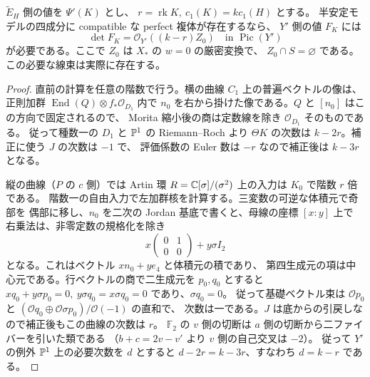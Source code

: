 \begin{proposition}[完全忠実性を仮定しない場合の必要な行列式]\label{vbm:prop:required-line}
$\widetilde E_H$ 側の値を $\Psi'(K)$ とし、
$r=\operatorname{rk}K,\ c_1(K)=k c_1(H)$ とする。
半安定モデルの四成分に compatible な perfect 複体が存在するなら、
$Y'$ 側の値 $F_K$ には
\[
                    \det F_K=\mathcal O_{Y'}((k-r)Z_0)
              \quad\text{in }\operatorname{Pic}(Y')
\]
が必要である。ここで $Z_0$ は $X_*$ の $w=0$ の厳密変換で、
$Z_0\cap S=\varnothing$ である。この必要な線束は実際に存在する。
\end{proposition}
\begin{proof}
直前の計算を任意の階数で行う。横の曲線 $C_1$ 上の普遍ベクトルの像は、
正則加群 $\operatorname{End}(Q)\otimes f_*\mathcal O_{D_1}$ 内で
$n_0$ を右から掛けた像である。$Q$ と $[n_0]$ はこの方向で固定されるので、
Morita 縮小後の商は定数線を除き $\mathcal O_{D_1}$ そのものである。
従って種数一の $D_1$ と $\mathbb P^1$ の Riemann--Roch より
$\Theta K$ の次数は $k-2r$。補正に使う $J$ の次数は $-1$ で、
評価係数の Euler 数は $-r$ なので補正後は $k-3r$ となる。

縦の曲線（$P$ の $c$ 側）では Artin 環
$R=\mathbb C[\sigma]/(\sigma^2)$ 上の入力は $K_0$ で階数 $r$ 倍である。
階数一の自由入力で左加群核を計算する。三変数の可逆な体積元で奇部を
偶部に移し、$n_0$ を二次の Jordan 基底で書くと、母線の座標 $[x:y]$ 上で
右乗法は、非零定数の規格化を除き
\[
         x\begin{pmatrix}0&1\\0&0\end{pmatrix}+y\sigma I_2
\]
となる。これはベクトル $x n_0+y e_4$ と体積元の積であり、
第四生成元の項は中心元である。行ベクトルの商で二生成元を $p_0,q_0$ とすると
$xq_0+y\sigma p_0=0,\ y\sigma q_0=x\sigma q_0=0$ であり、$\sigma q_0=0$。
従って基礎ベクトル束は $\mathcal O p_0$ と
$(\mathcal O q_0\oplus\mathcal O\sigma p_0)/\mathcal O(-1)$ の直和で、
次数は一である。$J$ は底からの引戻しなので補正後もこの曲線の次数は $r$。
$\mathbb F_2$ の $v$ 側の切断は $a$ 側の切断から二ファイバーを引いた類である
（$b+c=2v-v'$ より $v$ 側の自己交叉は $-2$）。
従って $Y'$ の例外 $\mathbb P^1$ 上の必要次数を $d$ とすると
$d-2r=k-3r$、すなわち $d=k-r$ である。


\end{proof}
